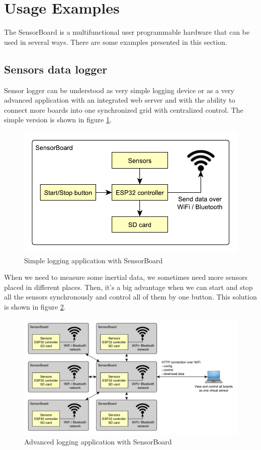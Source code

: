 \section{Usage Examples}
The SensorBoard is a multifunctional user programmable hardware that can be used in several ways. There are some examples presented in this section.

\subsection{Sensors data logger}
\label{ExampleLogger}
Sensor logger can be understood as very simple logging device or as a very advanced application with an integrated web server and with the ability to connect more boards into one synchronized grid with centralized control. The simple version is shown in figure \ref{UELogging1}.

\begin{figure}
    \centering
    \label{UELogging1}
    \caption{Simple logging application with SensorBoard}
    \includegraphics[scale=1]{img/UsageExamplesLogger1.pdf}
\end{figure}

When we need to measure some inertial data, we sometimes need more sensors placed in different places. Then, it's a big advantage when we can start and stop all the sensors synchronously and control all of them by one button. This solution is shown in figure \ref{UELogging2}.

\begin{figure}
    \centering
    \label{UELogging2}
    \caption{Advanced logging application with SensorBoard}
    \includegraphics[width=\linewidth]{img/UsageExamplesLogger2.pdf}
\end{figure}

